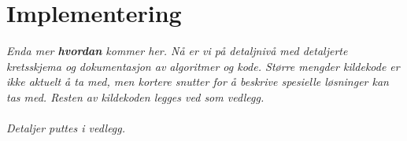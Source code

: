 \section{Implementering}
\label{sec:implementering}
\textit{Enda mer \textbf{hvordan} kommer her. Nå er vi på detaljnivå med detaljerte kretsskjema og dokumentasjon av algoritmer og kode. Større mengder kildekode er ikke aktuelt å ta med, men kortere snutter for å beskrive spesielle løsninger kan tas med. Resten av kildekoden legges ved som vedlegg. \\
\\
Detaljer puttes i vedlegg.}
